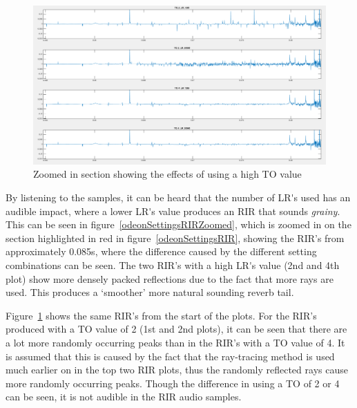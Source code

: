 \documentclass[../../main.tex]{subfiles}
\begin{document}
			\begin{figure}[h]
				\centerline{\includegraphics[width=\textwidth]{Sections/Implementation/Odeon/images/OdeonSettings/settingsFigure_TOZoom.png}}
				\caption{Zoomed in section showing the effects of using a high \ac{TO} value}
				\label{odeonSettings_TOZoomed}
			\end{figure}

				By listening to the samples, it can be heard that the number of \ac{LR's} used has an audible impact, where a lower \ac{LR's} value produces an \ac{RIR} that sounds \textit{grainy}. This can be seen in figure~\ref{odeonSettingsRIRZoomed}, which is zoomed in on the section highlighted in red in figure~\ref{odeonSettingsRIR}, showing the \ac{RIR}'s from approximately 0.085s, where the difference caused by the different setting combinations can be seen. The two \ac{RIR}'s with a high \ac{LR's} value (2nd and 4th plot) show more densely packed reflections due to the fact that more rays are used. This produces a `smoother' more natural sounding reverb tail.


				Figure~\ref{odeonSettings_TOZoomed} shows the same \ac{RIR}'s from the start of the plots. For the \ac{RIR}'s produced with a \ac{TO} value of 2 (1st and 2nd plots), it can be seen that there are a lot more randomly occurring peaks than in the \ac{RIR}'s with a \ac{TO} value of 4. It is assumed that this is caused by the fact that the ray-tracing method is used much earlier on in the top two \ac{RIR} plots, thus the randomly reflected rays cause more randomly occurring peaks. Though the difference in using a \ac{TO} of 2 or 4 can be seen, it is not audible in the \ac{RIR} audio samples.
\end{document}
